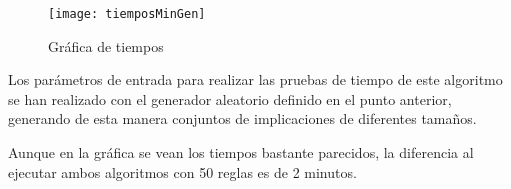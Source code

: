     \begin{figure}[H]
        \centering
        \texttt{[image: tiemposMinGen]}
        \caption{Gr\'afica de tiempos}
        \label{fig:tiemposMinGen}
    \end{figure}

    \clearpage


    Los par\'ametros de entrada para realizar las pruebas de tiempo de este algoritmo se han realizado con el generador aleatorio definido en 
    el punto anterior, generando de esta manera conjuntos de implicaciones de diferentes tama\~nos.

    Aunque en la gr\'afica se vean los tiempos bastante parecidos, la diferencia al ejecutar ambos algoritmos con 50 reglas es de 2 minutos.
